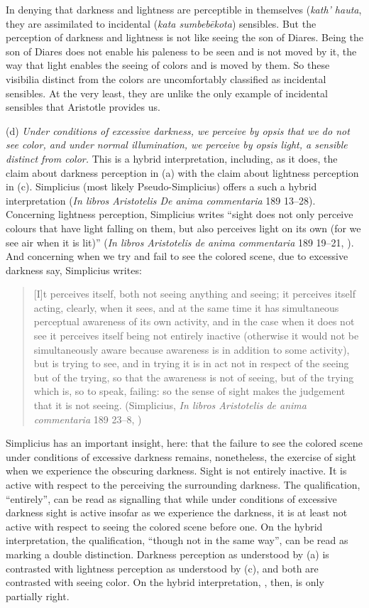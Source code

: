 In denying that darkness and lightness are perceptible in themselves (\emph{kath' hauta}, they are assimilated to incidental (\emph{kata sumbebēkota}) sensibles. But the perception of darkness and lightness is not like seeing the son of Diares. Being the son of Diares does not enable his paleness to be seen and is not moved by it, the way that light enables the seeing of colors and is moved by them. So these visibilia distinct from the colors are uncomfortably classified as incidental sensibles. At the very least, they are unlike the only example of incidental sensibles that Aristotle provides us.

(d) \emph{Under conditions of excessive darkness, we perceive by \emph{opsis} that we do not see color, and under normal illumination, we perceive by \emph{opsis} light, a sensible distinct from color.} This is a hybrid interpretation, including, as it does, the claim about darkness perception in (a) with the claim about lightness perception in (c). Simplicius (most likely Pseudo-Simplicius) offers a such a hybrid interpretation (\emph{In libros Aristotelis De anima commentaria} 189 13–28). Concerning lightness perception, Simplicius writes ``sight does not only perceive colours that have light falling on them, but also perceives light on its own (for we see air when it is lit)'' (\emph{In libros Aristotelis de anima commentaria} 189 19–21, \citealt[42]{Blumenthal:2000rf}). And concerning when we try and fail to see the colored scene, due to excessive darkness say, Simplicius writes:
\begin{quote}
	[I]t perceives itself, both not seeing anything and seeing; it perceives itself acting, clearly, when it sees, and at the same time it has simultaneous perceptual awareness of its own activity, and in the case when it does not see it perceives itself being not entirely inactive (otherwise it would not be simultaneously aware because awareness is in addition to some activity), but is trying to see, and in trying it is in act not in respect of the seeing but of the trying, so that the awareness is not of seeing, but of the trying which is, so to speak, failing: so the sense of sight makes the judgement that it is not seeing. (Simplicius, \emph{In libros Aristotelis de anima commentaria} 189 23–8, \citealt[42]{Blumenthal:2000rf})
\end{quote}
Simplicius has an important insight, here: that the failure to see the colored scene under conditions of excessive darkness remains, nonetheless, the exercise of sight when we experience the obscuring darkness. Sight is not entirely inactive. It is active with respect to the perceiving the surrounding darkness. The qualification, ``entirely'', can be read as signalling that while under conditions of excessive darkness sight is active insofar as we experience the darkness, it is at least not active with respect to seeing the colored scene before one. On the hybrid interpretation, the qualification, ``though not in the same way'', can be read as marking a double distinction. Darkness perception as understood by (a) is contrasted with lightness perception as understood by (c), and both are contrasted with seeing color. On the hybrid interpretation, \citet[275]{Ross:1961uq}, then, is only partially right.

